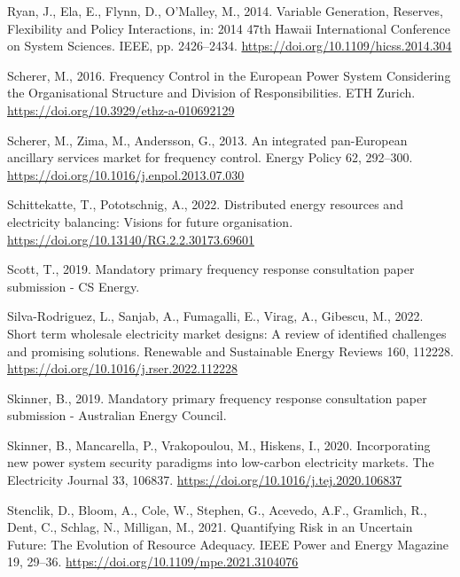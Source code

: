 \documentclass[12pt,a4paper,]{report}
\newlength{\cslhangindent}
\newenvironment{CSLReferences}[2] %
 {%
  \setlength{\parindent}{0pt}
  \ifodd #1 \everypar{\setlength{\hangindent}{\cslhangindent}}\ignorespaces\fi
  \ifnum #2 > 0
  \setlength{\parskip}{#2\baselineskip}
  \fi
 }%
 {}
\begin{document}
\begin{CSLReferences}{1}{0}
\leavevmode{}%
Ryan, J., Ela, E., Flynn, D., O'Malley, M., 2014. Variable {Generation},
{Reserves}, {Flexibility} and {Policy Interactions}, in: 2014 47th
{Hawaii International Conference} on {System Sciences}. {IEEE}, pp.
2426--2434. \url{https://doi.org/10.1109/hicss.2014.304}

\leavevmode{}%
Scherer, M., 2016. Frequency {Control} in the {European Power System
Considering} the {Organisational Structure} and {Division} of
{Responsibilities}. {ETH Zurich}.
\url{https://doi.org/10.3929/ethz-a-010692129}

\leavevmode{}%
Scherer, M., Zima, M., Andersson, G., 2013. An integrated pan-{European}
ancillary services market for frequency control. Energy Policy 62,
292--300. \url{https://doi.org/10.1016/j.enpol.2013.07.030}

\leavevmode{}%
Schittekatte, T., Pototschnig, A., 2022. Distributed energy resources
and electricity balancing: Visions for future organisation.
\url{https://doi.org/10.13140/RG.2.2.30173.69601}

\leavevmode{}%
Scott, T., 2019. Mandatory primary frequency response consultation paper
submission - {CS Energy}.

\leavevmode{}%
Silva-Rodriguez, L., Sanjab, A., Fumagalli, E., Virag, A., Gibescu, M.,
2022. Short term wholesale electricity market designs: {A} review of
identified challenges and promising solutions. Renewable and Sustainable
Energy Reviews 160, 112228.
\url{https://doi.org/10.1016/j.rser.2022.112228}

\leavevmode{}%
Skinner, B., 2019. Mandatory primary frequency response consultation
paper submission - {Australian Energy Council}.

\leavevmode{}%
Skinner, B., Mancarella, P., Vrakopoulou, M., Hiskens, I., 2020.
Incorporating new power system security paradigms into low-carbon
electricity markets. The Electricity Journal 33, 106837.
\url{https://doi.org/10.1016/j.tej.2020.106837}

\leavevmode{}%
Stenclik, D., Bloom, A., Cole, W., Stephen, G., Acevedo, A.F., Gramlich,
R., Dent, C., Schlag, N., Milligan, M., 2021. Quantifying {Risk} in an
{Uncertain Future}: {The Evolution} of {Resource Adequacy}. IEEE Power
and Energy Magazine 19, 29--36.
\url{https://doi.org/10.1109/mpe.2021.3104076}


\end{CSLReferences}
\end{document}
